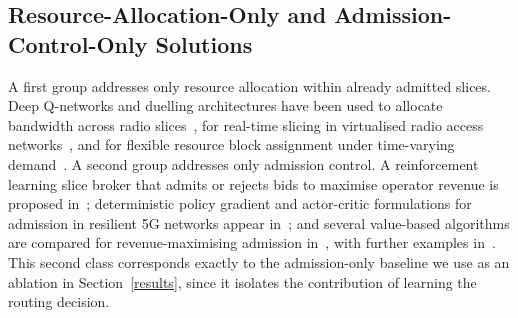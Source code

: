 \documentclass[10pt,journal,comsoc]{IEEEtran}
\begin{document}
\subsection{Resource-Allocation-Only and Admission-Control-Only Solutions}
A first group addresses only resource allocation within already admitted
slices. Deep Q-networks and duelling architectures have been used to
allocate bandwidth across radio slices~\cite{kim2019reinforcement}, for
real-time slicing in virtualised radio access
networks~\cite{van2019optimal}, and for flexible resource block
assignment under time-varying demand~\cite{abiko2020flexible}. A second
group addresses only admission control. A reinforcement learning slice
broker that admits or rejects bids to maximise operator revenue is
proposed in~\cite{sciancalepore2019rl}; deterministic policy gradient and
actor-critic formulations for admission in resilient 5G networks appear
in~\cite{10293471}; and several value-based algorithms are compared for
revenue-maximising admission in~\cite{9771643}, with further examples
in~\cite{10437226,Tao_2025}. This second class corresponds exactly to the
admission-only baseline we use as an ablation in
Section~\ref{results}, since it isolates the contribution of learning the
routing decision.
\end{document}
